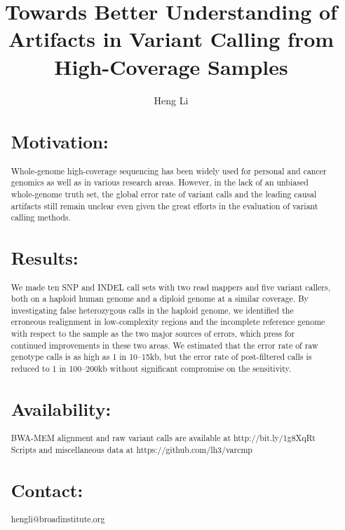 \documentclass{bioinfo}
\begin{document}

\title[Artifacts in variant calling]{Towards Better Understanding of Artifacts in Variant Calling from High-Coverage Samples}
\author[Li]{Heng Li}

\address{Broad Institute of Harvard and MIT, 7 Cambridge Center, Cambridge, MA 02142, USA}

\maketitle

\begin{abstract}

\section{Motivation:} Whole-genome high-coverage sequencing has been widely
used for personal and cancer genomics as well as in various research areas.
However, in the lack of an unbiased whole-genome truth set, the global error
rate of variant calls and the leading causal artifacts still remain unclear
even given the great efforts in the evaluation of variant calling methods.

\section{Results:} We made ten SNP and INDEL call sets with two read mappers
and five variant callers, both on a haploid human genome and a diploid genome
at a similar coverage. By investigating false heterozygous calls in the haploid
genome, we identified the erroneous realignment in low-complexity regions and
the incomplete reference genome with respect to the sample as the two major
sources of errors, which press for continued improvements in these two areas.
We estimated that the error rate of raw genotype calls is as high as 1 in
10--15kb, but the error rate of post-filtered calls is reduced to 1 in
100--200kb without significant compromise on the sensitivity.

\section{Availability:} BWA-MEM alignment and raw variant calls are available at http://bit.ly/1g8XqRt
Scripts and miscellaneous data at https://github.com/lh3/varcmp

\section{Contact:} hengli@broadinstitute.org

\end{abstract}
\end{document}
